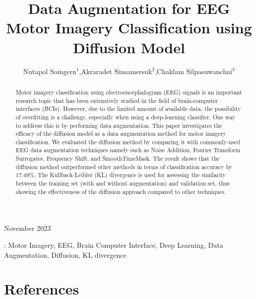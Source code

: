 \documentclass[12pt]{iopart}
\begin{document}
\title[EEG Augmentation with Diffusion Model]{Data Augmentation for EEG Motor Imagery Classification using Diffusion Model}

\author{Nutapol Soingern$^1$,Akraradet Sinsamersuk$^2$,Chaklam Silpasuwanchai$^3$}

\address{Asian Institute of Technology, School of Engineering and Technology, Data Science and Artificial Intelligence, Pathum Thani, Thailand}
\vspace{10pt}
\begin{indented}
\item[]November 2023
\end{indented}

\begin{abstract}
Motor imagery classification using electroencephalogram (EEG) signals is an important research topic that has been extensively studied in the field of brain-computer interfaces (BCIs). 
However, due to the limited amount of available data, the possibility of overfitting is a challenge, especially when using a deep-learning classifier. 
One way to address this is by performing data augmentation. 
This paper investigates the efficacy of the diffusion model as a data augmentation method for motor imagery classification. 
We evaluated the diffusion method by comparing it with commonly-used EEG data augmentation techniques namely such as Noise Addition, Fourier Transform Surrogates, Frequency Shift, and SmoothTimeMask. 
The result shows that the diffusion method outperformed other methods in terms of classification accuracy by 17.49\%. 
The Kullback-Leibler (KL) divergence is used for assessing the similarity between the training set (with and without augmentation) and validation set, thus showing the effectiveness of the diffusion approach compared to other techniques.
\end{abstract}

%
\vspace{2pc}
: Motor Imagery, EEG, Brain Computer Interface, Deep Learning, Data Augmentation, Diffusion, KL divergence
%
%
%
% 
%









\section*{References}


\end{document}

